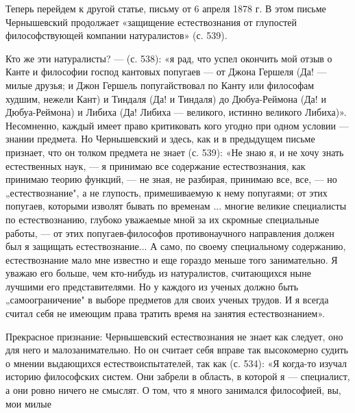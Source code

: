 Теперь перейдем  к другой статье,  письму от 6  апреля 1878 г.  В этом
письме Чернышевский продолжает  «защищение естествознания от глупостей
философствующей компании натуралистов» (с. 539).

Кто же эти  натуралисты? --- (с. 538): «я рад,  что успел окончить мой
отзыв  о Канте  и  философии  господ кантовых  попугаев  --- от  Джона
Гершеля (Да! --- милые друзья;  и Джон Гершель попугайствовал по Канту
или  философам худшим,  нежели  Кант)  и Тиндаля  (Да!  и Тиндаля)  до
Дюбуа-Реймона (Да! и Дюбуа-Реймона) и Либиха (Да! Либиха --- великого,
истинно великого Либиха)». Несомненно,  каждый имеет право критиковать
кого угодно при  одном условии --- знании предмета.  Но Чернышевский и
здесь, как и  в предыдущем письме признает, что он  толком предмета не
знает (с. 539): «Не  знаю я, и не хочу знать  естественных наук, --- я
принимаю все  содержание естествознания, как принимаю  теорию функций,
--- не зная, не разбирая,  принимаю все, все, --- но „естествознание",
а  не глупость,  примешиваемую  к нему  попугаями;  от этих  попугаев,
которыми изволят бывать по временам  ... многие великие специалисты по
естествознанию,  глубоко уважаемые  мной  за  их скромные  специальные
работы,  --- от  этих  попугаев-философов противонаучного  направления
должен был я защищать естествознание... А само, по своему специальному
содержанию, естествознание мало мне известно и еще гораздо меньше того
занимательно.  Я уважаю  его больше,  чем кто-нибудь  из натуралистов,
считающихся ныне лучшими  его представителями. Но у  каждого из ученых
должно  быть „самоограничение"  в  выборе предметов  для своих  ученых
трудов.  И я  всегда считал  себя не  имеющим права  тратить время  на
занятия естествознанием».

Прекрасное  признание:   Чернышевский  естествознания  не   знает  как
следует, оно  для него и  малозанимательно. Но он считает  себя вправе
так высокомерно  судить о  мнении выдающихся  естествоиспытателей, так
как  (с. 534):  «Я  когда-то изучал  историю  философских систем.  Они
забрели в область,  в которой я --- специалист, а  они ровно ничего не
смыслят. О том, что я много занимался философией, вы, мои милые
